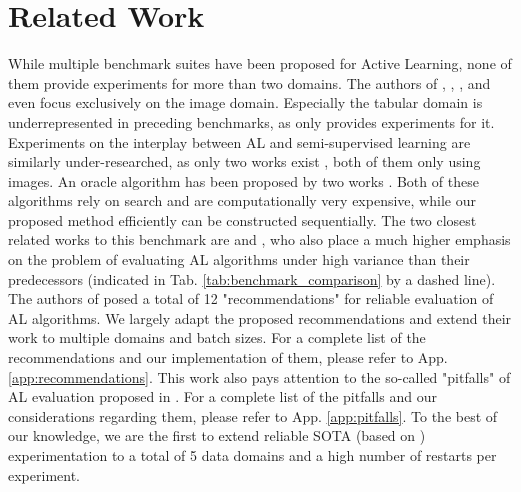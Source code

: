 \documentclass[]{article}
\begin{document}
\section{Related Work}
While multiple benchmark suites have been proposed for Active Learning, none of them provide experiments for more than two domains.
The authors of \cite{beck2021effective}, \cite{munjal2022towards}, \cite{li2022empirical}, \cite{ji2023randomness} and \cite{luth2024navigating} even focus exclusively on the image domain.
Especially the tabular domain is underrepresented in preceding benchmarks, as only \cite{zhan2022comparative} provides experiments for it.
Experiments on the interplay between AL and semi-supervised learning are similarly under-researched, as only two works exist \cite{li2022empirical, luth2024navigating}, both of them only using images.
An oracle algorithm has been proposed by two works \cite{zhou2021towards, zhan2022comparative}. 
Both of these algorithms rely on search and are computationally very expensive, while our proposed method efficiently can be constructed sequentially.
The two closest related works to this benchmark are \cite{ji2023randomness} and \cite{luth2024navigating}, who also place a much higher emphasis on the problem of evaluating AL algorithms under high variance than their predecessors (indicated in Tab. \ref{tab:benchmark_comparison} by a dashed line).
The authors of \cite{ji2023randomness} posed a total of 12 "recommendations" for reliable evaluation of AL algorithms.
We largely adapt the proposed recommendations and extend their work to multiple domains and batch sizes.
For a complete list of the recommendations and our implementation of them, please refer to App. \ref{app:recommendations}.
This work also pays attention to the so-called "pitfalls" of AL evaluation proposed in \cite{luth2024navigating}.
For a complete list of the pitfalls and our considerations regarding them, please refer to App. \ref{app:pitfalls}.
To the best of our knowledge, we are the first to extend reliable SOTA (based on \cite{ji2023randomness, luth2024navigating}) experimentation to a total of 5 data domains and a high number of restarts per experiment.
\end{document}
